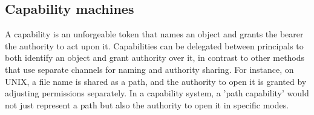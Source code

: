 \subsection{Capability machines}
A capability is an unforgeable token that names an object and grants the bearer the authority to act upon it. Capabilities can be delegated between 
principals to both identify an object and grant authority over it, in contrast to other methods that use separate channels for 
naming and authority sharing. For instance, on UNIX, a file name is shared as a path, and the authority to open it is 
granted by adjusting permissions separately. In a capability system, a 'path capability' would not just represent a 
path but also the authority to open it in specific modes.

